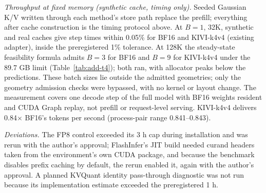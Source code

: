 \textit{Throughput at fixed memory (synthetic cache, timing only).}
Seeded Gaussian K/V written through each method's store path replace the prefill; everything after cache construction is the timing protocol above.
At $B = 1$, 32K, synthetic and real caches give step times within 0.05\% for BF16 and KIVI-k4v4 (existing adapter), inside the preregistered 1\% tolerance.
At 128K the steady-state feasibility formula admits $B = 3$ for BF16 and $B = 9$ for KIVI-k4v4 under the 89.7 GB limit (Table~\ref{tab:add-t4}); both ran, with allocator peaks below the predictions.
These batch sizes lie outside the admitted geometries; only the geometry admission checks were bypassed, with no kernel or layout change.
The measurement covers one decode step of the full model with BF16 weights resident and CUDA Graph replay, not prefill or request-level serving.
KIVI-k4v4 delivers 0.84$\times$ BF16's tokens per second (process-pair range 0.841--0.843).

\textit{Deviations.}
The FP8 control exceeded its 3 h cap during installation and was rerun with the author's approval; FlashInfer's JIT build needed curand headers taken from the environment's own CUDA package, and because the benchmark disables prefix caching by default, the rerun enabled it, again with the author's approval.
A planned KVQuant identity pass-through diagnostic was not run because its implementation estimate exceeded the preregistered 1 h.
